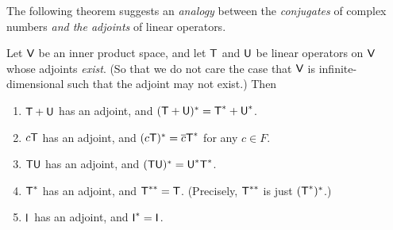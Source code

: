 The following theorem suggests an \emph{analogy} between the \emph{conjugates} of complex numbers \emph{and the adjoints} of linear operators.

\begin{theorem} \label{thm 6.11}
Let \(\textsf{V}\) be an inner product space, and let \(\textsf{T}\) and \(\textsf{U}\) be linear operators on \(\textsf{V}\) whose adjoints \emph{exist}.
(So that we do not care the case that \(\textsf{V}\) is infinite-dimensional such that the adjoint may not exist.)
Then
\begin{enumerate}
\item \(\textsf{T} + \textsf{U}\) has an adjoint, and \((\textsf{T} + \textsf{U})^* = \textsf{T}^* + \textsf{U}^*\).
\item \(c\textsf{T}\) has an adjoint, and \((c\textsf{T})^* = \overline{c}\textsf{T}^*\) for any \(c \in F\).
\item \(\textsf{T}\textsf{U}\) has an adjoint, and \((\textsf{T}\textsf{U})^* = \textsf{U}^*\textsf{T}^*\).
\item \(\textsf{T}^*\) has an adjoint, and \(\textsf{T}^{**} = \textsf{T}\).
(Precisely, \(\textsf{T}^{**}\) is just \((\textsf{T}^*)^*\).)
\item \(\textsf{I}_{_{}}\) has an adjoint, and \(\textsf{I}_{_{}}^* = \textsf{I}_{_{}}\).
\end{enumerate}
\end{theorem}

